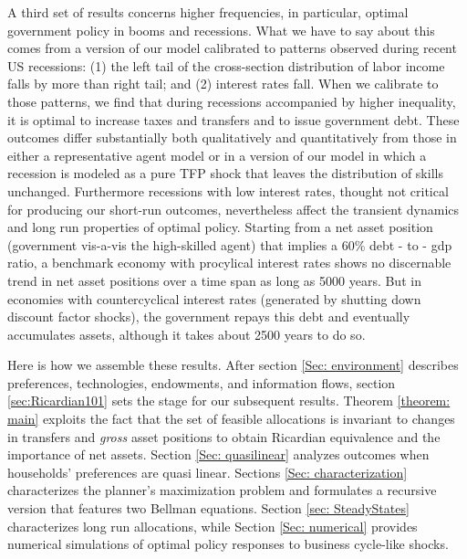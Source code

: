 \documentclass[thmsb,11pt]{article}
\begin{document}
A third set of results concerns higher frequencies, in particular,  optimal government policy in booms and recessions.
What we have to say about this comes from a  version of our model calibrated to patterns observed
 during recent US recessions:  (1) the left tail of the cross-section distribution of labor income falls by more than right tail; and (2) interest rates fall. When we calibrate  to those patterns, we find that during recessions accompanied by higher inequality, it is  optimal to increase taxes and transfers and to issue
government debt. %
These outcomes differ substantially both qualitatively and quantitatively from those in either a representative agent model or in a version of
 our model in which a  recession is modeled as a pure TFP shock that leaves the distribution of skills unchanged. Furthermore recessions with low interest rates, thought not critical for producing our short-run outcomes, nevertheless  affect the transient dynamics and long run properties of optimal policy. Starting from a net asset position (government vis-a-vis the high-skilled agent) that implies a 60\% debt - to - gdp ratio, a benchmark economy with procylical interest rates shows no discernable trend in net asset positions over a time span as long as 5000 years. But in economies with countercyclical interest rates  (generated by shutting down discount factor shocks), the government repays this debt and eventually accumulates assets, although it takes about 2500 years to do so.



Here is how we assemble these results.
After section \ref{Sec: environment} describes preferences, technologies, endowments, and
information flows, section
\ref{sec:Ricardian101} sets the stage for our subsequent results. Theorem \ref{theorem: main}
exploits the fact that the set of feasible allocations is invariant to changes in transfers and \emph{gross} asset positions to obtain  Ricardian equivalence and the importance of net assets.  Section \ref{Sec: quasilinear}
analyzes outcomes when households' preferences are quasi linear. Sections \ref{Sec: characterization} characterizes  the planner's maximization problem and formulates a recursive version that features two Bellman equations. Section \ref{sec: SteadyStates} characterizes  long run allocations, while Section \ref{Sec: numerical} provides numerical simulations of  optimal policy responses to business cycle-like shocks.
\end{document}
